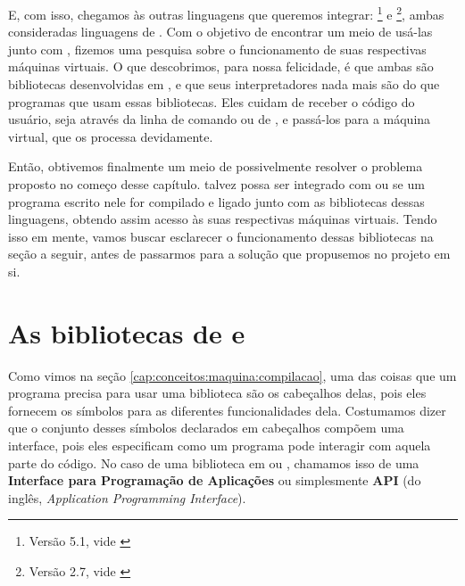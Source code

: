     E, com isso, chegamos às outras linguagens que queremos integrar:
    \footnote{Versão 5.1, vide \cite{lua:00}} e
    \footnote{Versão 2.7, vide \cite{python:00}}, ambas
    consideradas linguagens de \script{}. Com o objetivo de encontrar um meio de
    usá-las junto com \CXX{}, fizemos uma pesquisa sobre o funcionamento de suas
    respectivas máquinas virtuais. O que descobrimos, para nossa felicidade, é
    que ambas são bibliotecas desenvolvidas em \C{}, e que seus interpretadores
    nada mais são do que programas que usam essas bibliotecas. Eles cuidam de
    receber o código do usuário, seja através da linha de comando ou de
    , e passá-los para a máquina virtual, que os processa devidamente.
    
    Então, obtivemos finalmente um meio de possivelmente resolver o problema
    proposto no começo desse capítulo. \CXX{} talvez possa ser integrado com
     ou  se um programa escrito nele for compilado e
    ligado junto com as bibliotecas dessas linguagens, obtendo assim acesso às
    suas respectivas máquinas virtuais. Tendo isso em mente, vamos buscar
    esclarecer o funcionamento dessas bibliotecas na seção a seguir, antes de
    passarmos para a solução que propusemos no projeto em si.

  \section{As bibliotecas de  e }
  \label{cap:conceitos:apis}

    Como vimos na seção \ref{cap:conceitos:maquina:compilacao}, uma das coisas
    que um programa precisa para usar uma biblioteca são os cabeçalhos delas,
    pois eles fornecem os símbolos para as diferentes funcionalidades dela.
    Costumamos dizer que o conjunto desses símbolos declarados em cabeçalhos
    compõem uma interface, pois eles especificam como um programa pode interagir
    com aquela parte do código. No caso de uma biblioteca em \C{} ou \CXX{},
    chamamos isso de uma \textbf{Interface para Programação de Aplicações} ou
    simplesmente \textbf{API} (do inglês, \textit{Application Programming
    Interface})\footnotemark{}.


